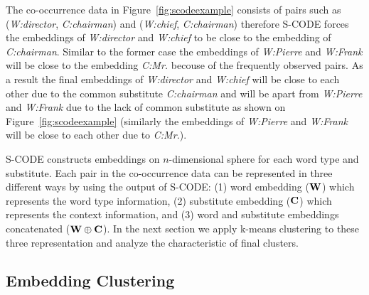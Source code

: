 
The co-occurrence data in Figure~\ref{fig:scodeexample} consists of
pairs such as (\textit{W:director}, \textit{C:chairman}) and
(\textit{W:chief}, \textit{C:chairman}) therefore S-CODE forces the
embeddings of \textit{W:director} and \textit{W:chief} to be close to
the embedding of \textit{C:chairman}.  Similar to the former case the
embeddings of \textit{W:Pierre} and \textit{W:Frank} will be close to
the embedding \textit{C:Mr.} becouse of the frequently observed pairs.
As a result the final embeddings of \textit{W:director} and
\textit{W:chief} will be close to each other due to the common
substitute \textit{C:chairman} and will be apart from
\textit{W:Pierre} and \textit{W:Frank} due to the lack of common
substitute as shown on Figure~\ref{fig:scodeexample} (similarly the
embeddings of \textit{W:Pierre} and \textit{W:Frank} will be close to
each other due to \textit{C:Mr.}).

S-CODE constructs embeddings on $n$-dimensional sphere for each word
type and substitute.  Each pair in the co-occurrence data can be
represented in three different ways by using the output of S-CODE: (1)
word embedding (${\bf W}$) which represents the word type information,
(2) substitute embedding (${\bf C}$) which represents the context
information, and (3) word and substitute embeddings concatenated
(${\bf W}\oplus{\bf C}$).  In the next section we apply k-means
clustering to these three representation and analyze the
characteristic of final clusters.

\subsection{Embedding Clustering}
\label{sec:clustering}

